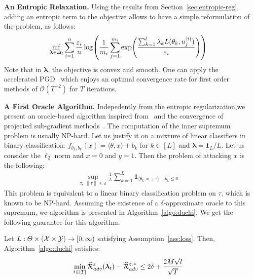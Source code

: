 \textbf{An Entropic Relaxation.} Using the results from Section~\ref{sec:entropic-reg}, adding an entropic term to the objective allows to have a simple reformulation of the problem, as follows:
\begin{align*}
  \inf_{\bm{\lambda}\in \Delta_l}\sum_{i=1}^\numsamples  \frac{\varepsilon_i}{\numsamples}\log\left( \frac{1}{m_i}\sum_{j=1}^{m_i}\exp\left(\frac{\sum_{k=1}^l \lambda_k\loss(\theta_k,u_j^{(i)})}{\varepsilon_i}\right)\right)
\end{align*}
Note that in $\bm{\lambda}$, the objective is convex and smooth. One can  apply the accelerated PGD~\citep{beck2009fast,tseng2008accelerated} which enjoys an optimal convergence rate for first order methods of $\mathcal{O}(T^{-2})$ for $T$ iterations.

\textbf{A First Oracle Algorithm.} Indepedently from  the entropic regularization,we present an oracle-based algorithm inspired from~\citep{sinha2017certifying} and the convergence of projected sub-gradient methods~\citep{boyd2003subgradient}. The computation of the inner supremum problem is usually NP-hard. Let us justify it on a mixture of linear classifiers in binary classification: $f_{\theta_k,b_k}(x) = \langle \theta,x\rangle+b_k$ for $k\in [L]$ and $\bm{\lambda}=\mathbf{1}_L/L$. Let us consider the $\ell_2$ norm and $x=0$ and $y=1$. Then the problem of attacking $x$ is the following:
\begin{align*}
    \sup_{\tau,~\lVert \tau\rVert\leq\varepsilon} \frac{1}{L}\sum_{k=1}^L\mathbf{1}_{\langle \theta_k,x+\tau\rangle+b_k\leq0}
\end{align*}
This problem is equivalent to a linear binary classification problem on $\tau$, which is known to be NP-hard. Assuming the existence of a $\delta$-approximate oracle to this supremum, we algorithm is presented in Algorithm~\ref{algo:duchi}. We get the following guarantee for this algorithm. %
\begin{prop}
\label{prop:algo-oracle}
Let $L:\Theta\times(\mathcal{X}\times\mathcal{Y})\to [0,\infty)$ satisfying Assumption~\ref{ass:loss}. Then, Algorithm~\ref{algo:duchi} satisfies:  
\begin{align*}
    \min_{t\in[T]} \widehat{\mathcal{R}}_{adv}^{\varepsilon}(\bm{\lambda}_t)-\widehat{\mathcal{R}}_{adv}^{\varepsilon,*}\leq2\delta+\textcolor{black}{ \frac{2M\sqrt{l}}{\sqrt{T}}}
\end{align*}
\end{prop}

